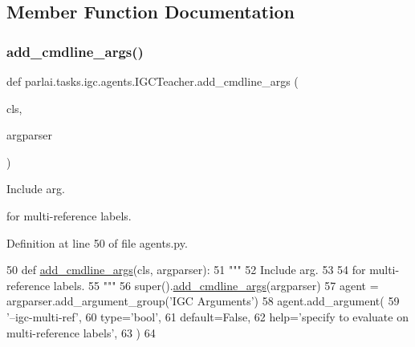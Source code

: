 \subsection{Member Function Documentation}
\mbox{\label{classparlai_1_1tasks_1_1igc_1_1agents_1_1IGCTeacher_ac035ed9d99a20a3e9d17870c777f178c}} 
\subsubsection{\texorpdfstring{add\+\_\+cmdline\+\_\+args()}{add\_cmdline\_args()}}
{\footnotesize\ttfamily def parlai.\+tasks.\+igc.\+agents.\+I\+G\+C\+Teacher.\+add\+\_\+cmdline\+\_\+args (\begin{DoxyParamCaption}\item[{}]{cls,  }\item[{}]{argparser }\end{DoxyParamCaption})}

\begin{DoxyVerb}Include arg.

for multi-reference labels.
\end{DoxyVerb}
 

Definition at line 50 of file agents.\+py.


\begin{DoxyCode}
50     \textcolor{keyword}{def }\hyperlink{namespaceparlai_1_1agents_1_1drqa_1_1config_a62fdd5554f1da6be0cba185271058320}{add\_cmdline\_args}(cls, argparser):
51         \textcolor{stringliteral}{"""}
52 \textcolor{stringliteral}{        Include arg.}
53 \textcolor{stringliteral}{}
54 \textcolor{stringliteral}{        for multi-reference labels.}
55 \textcolor{stringliteral}{        """}
56         super().\hyperlink{namespaceparlai_1_1agents_1_1drqa_1_1config_a62fdd5554f1da6be0cba185271058320}{add\_cmdline\_args}(argparser)
57         agent = argparser.add\_argument\_group(\textcolor{stringliteral}{'IGC Arguments'})
58         agent.add\_argument(
59             \textcolor{stringliteral}{'--igc-multi-ref'},
60             type=\textcolor{stringliteral}{'bool'},
61             default=\textcolor{keyword}{False},
62             help=\textcolor{stringliteral}{'specify to evaluate on multi-reference labels'},
63         )
64 
\end{DoxyCode}
\mbox{\label{classparlai_1_1tasks_1_1igc_1_1agents_1_1IGCTeacher_a96b554e753849931b6b45502f26cc39e}} 
